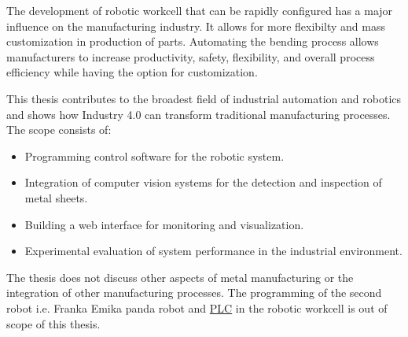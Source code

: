 The development of robotic workcell that can be rapidly configured has a major influence on the manufacturing industry. It allows for more flexibilty and mass customization in production of parts. \cite{CHEN2001199} Automating the bending process allows manufacturers to increase productivity, safety, flexibility, and overall process efficiency while having the option for customization. \cite[page 9]{russmann2015industry} 

This thesis contributes to the broadest field of industrial automation and robotics and shows how Industry 4.0 can transform traditional manufacturing processes.
The scope consists of:
\begin{itemize}
    \item Programming control software for the robotic system. 
    \item Integration of computer vision systems for the detection and inspection of metal sheets.
    \item Building a web interface for monitoring and visualization.
    \item Experimental evaluation of system performance in the industrial environment. 
\end{itemize}

The thesis does not discuss other aspects of metal manufacturing or the integration of other manufacturing processes.
The programming of the second robot i.e. Franka Emika panda robot and \hyperref[acro:PLC]{PLC} in the robotic workcell is out of scope of this thesis.